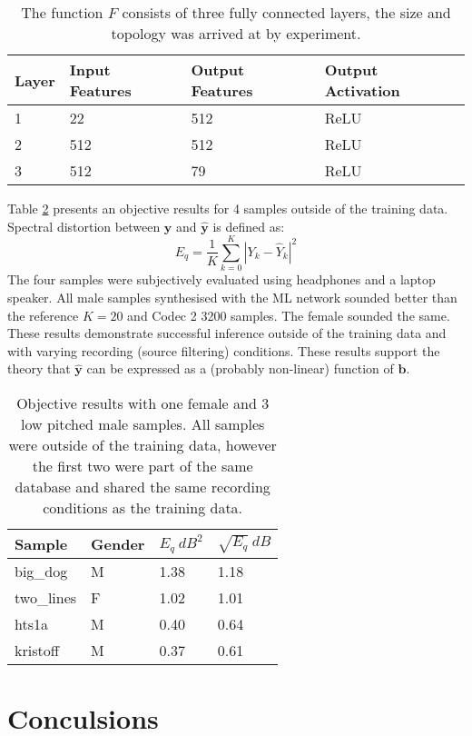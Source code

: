 \documentclass{article}
\begin{document}
\begin{table}[H]
\label{tab:ml_network}
\centering
\begin{tabular}{l l l l}
\hline
Layer & Input Features & Output Features & Output Activation \\
\hline
1 & 22 & 512 & ReLU  \\
2 & 512 & 512 & ReLU  \\
3 & 512 & 79 & ReLU  \\
\hline
\end{tabular}
\caption{The function $F$ consists of three fully connected layers, the size and topology was arrived at by experiment.}
\end{table}

Table \ref{tab:ml_sd} presents an objective results for 4 samples outside of the training data.  Spectral distortion between $\mathbf{y}$ and $\hat{\mathbf{y}}$ is defined as:
\begin{equation}
E_q = \frac{1}{K}\sum_{k=0}^K |Y_k - \hat{Y}_k |^2
\end{equation}
The four samples were subjectively evaluated using headphones and a laptop speaker.  All male samples synthesised with the ML network sounded better than the reference $K=20$ and Codec 2 3200 samples.  The female sounded the same.  These results demonstrate successful inference outside of the training data and with varying recording (source filtering) conditions. These results support the theory that $\hat{\mathbf{y}}$ can be expressed as a (probably non-linear) function of $\mathbf{b}$.

\begin{table}[H]
\label{tab:ml_sd}
\centering
\begin{tabular}{l l l l}
\hline
Sample & Gender & $E_q \: dB^2$ & $\sqrt{E_q} \: dB$  \\
\hline
big\_dog & M & 1.38 & 1.18  \\
two\_lines & F & 1.02 & 1.01 \\
hts1a & M & 0.40 & 0.64 \\
kristoff & M & 0.37 & 0.61  \\
\hline
\end{tabular}
\caption{Objective results with one female and 3 low pitched male samples.  All samples were outside of the training data, however the first two were part of the same database and shared the same recording conditions as the training data.}
\end{table}

\section{Conculsions}
\end{document}
